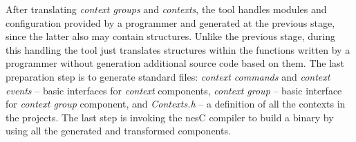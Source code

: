 After translating \emph{context groups} and \emph{contexts}, the tool handles
modules and configuration provided by a programmer and generated at the previous
stage, since the latter also may contain \conesc structures. Unlike the previous
stage, during this handling the tool just translates \conesc structures within
the functions written by a programmer without generation additional source code
based on them. The last preparation step is to generate standard files:
\emph{context commands} and \emph{context events} -- basic interfaces for
\emph{context} components, \emph{context group} -- basic interface for
\emph{context group} component, and \emph{Contexts.h} -- a definition of all the
contexts in the projects. The last step is invoking the nesC compiler to build a binary by using all the
generated and transformed components.
